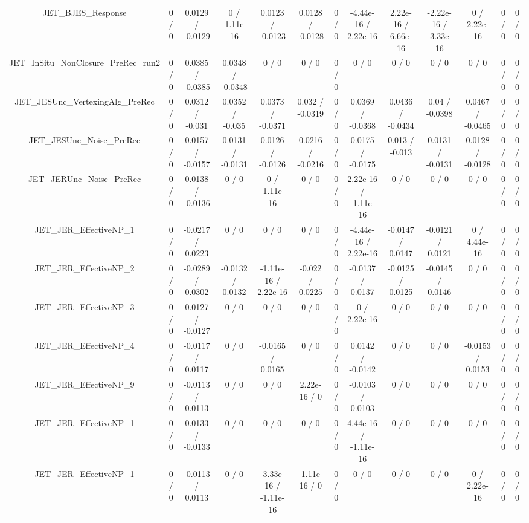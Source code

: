 \documentclass[10pt]{article}
\begin{document}
\begin{table}[htbp]
\begin{center}
\begin{tabular}{|c|c|c|c|c|c|c|c|c|c|c|c|c|}
  JET_BJES_Response & 0 / 0 & 0.0129 / -0.0129 & 0 / -1.11e-16 & 0.0123 / -0.0123 & 0.0128 / -0.0128 & 0 / 0 & -4.44e-16 / 2.22e-16 & 2.22e-16 / 6.66e-16 & -2.22e-16 / -3.33e-16 & 0 / 2.22e-16 & 0 / 0 & 0 / 0 \\ 
  JET_InSitu_NonClosure_PreRec_run2 & 0 / 0 & 0.0385 / -0.0385 & 0.0348 / -0.0348 & 0 / 0 & 0 / 0 & 0 / 0 & 0 / 0 & 0 / 0 & 0 / 0 & 0 / 0 & 0 / 0 & 0 / 0 \\ 
  JET_JESUnc_VertexingAlg_PreRec & 0 / 0 & 0.0312 / -0.031 & 0.0352 / -0.035 & 0.0373 / -0.0371 & 0.032 / -0.0319 & 0 / 0 & 0.0369 / -0.0368 & 0.0436 / -0.0434 & 0.04 / -0.0398 & 0.0467 / -0.0465 & 0 / 0 & 0 / 0 \\ 
  JET_JESUnc_Noise_PreRec & 0 / 0 & 0.0157 / -0.0157 & 0.0131 / -0.0131 & 0.0126 / -0.0126 & 0.0216 / -0.0216 & 0 / 0 & 0.0175 / -0.0175 & 0.013 / -0.013 & 0.0131 / -0.0131 & 0.0128 / -0.0128 & 0 / 0 & 0 / 0 \\ 
  JET_JERUnc_Noise_PreRec & 0 / 0 & 0.0138 / -0.0136 & 0 / 0 & 0 / -1.11e-16 & 0 / 0 & 0 / 0 & 2.22e-16 / -1.11e-16 & 0 / 0 & 0 / 0 & 0 / 0 & 0 / 0 & 0 / 0 \\ 
  JET_JER_EffectiveNP_1 & 0 / 0 & -0.0217 / 0.0223 & 0 / 0 & 0 / 0 & 0 / 0 & 0 / 0 & -4.44e-16 / 2.22e-16 & -0.0147 / 0.0147 & -0.0121 / 0.0121 & 0 / 4.44e-16 & 0 / 0 & 0 / 0 \\ 
  JET_JER_EffectiveNP_2 & 0 / 0 & -0.0289 / 0.0302 & -0.0132 / 0.0132 & -1.11e-16 / 2.22e-16 & -0.022 / 0.0225 & 0 / 0 & -0.0137 / 0.0137 & -0.0125 / 0.0125 & -0.0145 / 0.0146 & 0 / 0 & 0 / 0 & 0 / 0 \\ 
  JET_JER_EffectiveNP_3 & 0 / 0 & 0.0127 / -0.0127 & 0 / 0 & 0 / 0 & 0 / 0 & 0 / 0 & 0 / 2.22e-16 & 0 / 0 & 0 / 0 & 0 / 0 & 0 / 0 & 0 / 0 \\ 
  JET_JER_EffectiveNP_4 & 0 / 0 & -0.0117 / 0.0117 & 0 / 0 & -0.0165 / 0.0165 & 0 / 0 & 0 / 0 & 0.0142 / -0.0142 & 0 / 0 & 0 / 0 & -0.0153 / 0.0153 & 0 / 0 & 0 / 0 \\ 
  JET_JER_EffectiveNP_9 & 0 / 0 & -0.0113 / 0.0113 & 0 / 0 & 0 / 0 & 2.22e-16 / 0 & 0 / 0 & -0.0103 / 0.0103 & 0 / 0 & 0 / 0 & 0 / 0 & 0 / 0 & 0 / 0 \\ 
  JET_JER_EffectiveNP_1 & 0 / 0 & 0.0133 / -0.0133 & 0 / 0 & 0 / 0 & 0 / 0 & 0 / 0 & 4.44e-16 / -1.11e-16 & 0 / 0 & 0 / 0 & 0 / 0 & 0 / 0 & 0 / 0 \\ 
  JET_JER_EffectiveNP_1 & 0 / 0 & -0.0113 / 0.0113 & 0 / 0 & -3.33e-16 / -1.11e-16 & -1.11e-16 / 0 & 0 / 0 & 0 / 0 & 0 / 0 & 0 / 0 & 0 / 2.22e-16 & 0 / 0 & 0 / 0 \\ 

\end{tabular}
\end{center}
\end{table}
\end{document}
